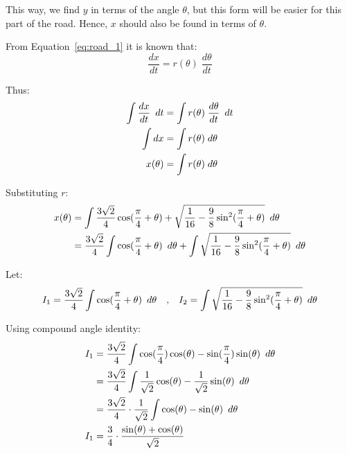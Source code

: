 \documentclass[12pt]{article}
\newcommand{\Hquad}{\hspace{0.5em}}
\begin{document}
        This way, we find $y$ in terms of the angle $\theta$, but this form will be easier for this part of the road. Hence, $x$ should also be found in terms of $\theta$.

        From Equation~\ref{eq:road_1} it is known that:
        \begin{equation}
            \frac{dx}{dt} = r(\theta) \;\frac{d\theta}{dt}
        \end{equation}

        Thus:
        \begin{align}
            \int \frac{dx}{dt} \Hquad dt &= \int r(\theta) \;\frac{d\theta}{dt} \Hquad dt \\
            \int dx &= \int r(\theta) \;d\theta \\
            x(\theta) &= \int r(\theta) \;d\theta
        \end{align}

        Substituting $r$:
        \begin{align}
            x(\theta) &= \int \frac{3\sqrt{2}}{4} \cos (\frac{\pi}{4} + \theta) + \sqrt{\frac{1}{16} - \frac{9}{8} \sin^2 (\frac{\pi}{4}+\theta)} \Hquad d\theta \\
            &= \frac{3\sqrt{2}}{4} \int \cos (\frac{\pi}{4} + \theta) \Hquad d\theta + \int \sqrt{\frac{1}{16} - \frac{9}{8} \sin^2 (\frac{\pi}{4}+\theta)} \Hquad d\theta
        \end{align}

        Let:
        \begin{align}
            I_1 = \frac{3\sqrt{2}}{4} \int \cos (\frac{\pi}{4} + \theta) \Hquad d\theta \quad \text{,} \quad
            I_2 = \int \sqrt{\frac{1}{16} - \frac{9}{8} \sin^2 (\frac{\pi}{4}+\theta)} \Hquad d\theta
        \end{align}

        Using compound angle identity:
        \begin{align}
            I_1 &= \frac{3\sqrt{2}}{4} \int \cos (\frac{\pi}{4}) \cos(\theta) - \sin(\frac{\pi}{4}) \sin(\theta) \Hquad d\theta \\
            &= \frac{3\sqrt{2}}{4} \int \frac{1}{\sqrt{2}} \cos(\theta) - \frac{1}{\sqrt{2}} \sin(\theta) \Hquad d\theta \\
            &= \frac{3\sqrt{2}}{4} \cdot \frac{1}{\sqrt{2}} \int \cos(\theta) - \sin(\theta) \Hquad d\theta \\
            I_1 &= \frac{3}{4} \cdot \frac{\sin(\theta) + \cos(\theta)}{\sqrt{2}}
        \end{align}
\end{document}
